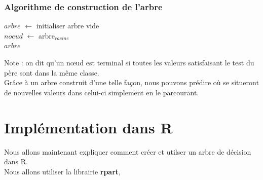 \documentclass[compress]{beamer}
\begin{document}
\begin{frame}
\frametitle{Algorithme de construction de l'arbre}
\begin{algorithm}[H]


$arbre$ $\leftarrow$ initialiser arbre vide \\
$noeud$ $\leftarrow$ arbre$_{racine}$ \\
\Retour $arbre$
\BlankLine
\end{algorithm}
\end{frame}

\begin{frame}
Note : on dit qu'un nœud est terminal si toutes les valeurs satisfaisant le test du père sont dans la même classe.\\
Grâce à un arbre construit d'une telle façon, nous pouvons prédire où se situeront de nouvelles valeurs dans celui-ci simplement en le parcourant.
\end{frame}

\section{Implémentation dans R}

\begin{frame}
Nous allons maintenant expliquer comment créer et utilser un arbre de décision dans R.\\
Nous allons utiliser la librairie \textbf{rpart}, 
\end{frame}
\end{document}
